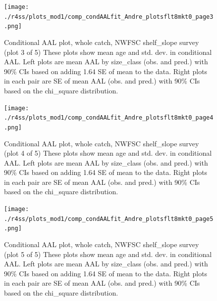 \documentclass[12pt,]{article}
\begin{document}
\begin{figure}
\centering
\texttt{[image: ./r4ss/plots\_mod1/comp\_condAALfit\_Andre\_plotsflt8mkt0\_page3.png]}
\caption{Conditional AAL plot, whole catch, NWFSC shelf\_slope survey
(plot 3 of 5) These plots show mean age and std. dev. in conditional
AAL. Left plots are mean AAL by size\_class (obs. and pred.) with 90\%
CIs based on adding 1.64 SE of mean to the data. Right plots in each
pair are SE of mean AAL (obs. and pred.) with 90\% CIs based on the
chi\_square distribution. \label{fig:nwfsc_combo_andre_3}}
\end{figure}

\begin{figure}
\centering
\texttt{[image: ./r4ss/plots\_mod1/comp\_condAALfit\_Andre\_plotsflt8mkt0\_page4.png]}
\caption{Conditional AAL plot, whole catch, NWFSC shelf\_slope survey
(plot 4 of 5) These plots show mean age and std. dev. in conditional
AAL. Left plots are mean AAL by size\_class (obs. and pred.) with 90\%
CIs based on adding 1.64 SE of mean to the data. Right plots in each
pair are SE of mean AAL (obs. and pred.) with 90\% CIs based on the
chi\_square distribution. \label{fig:nwfsc_combo_andre_4}}
\end{figure}

\begin{figure}
\centering
\texttt{[image: ./r4ss/plots\_mod1/comp\_condAALfit\_Andre\_plotsflt8mkt0\_page5.png]}
\caption{Conditional AAL plot, whole catch, NWFSC shelf\_slope survey
(plot 5 of 5) These plots show mean age and std. dev. in conditional
AAL. Left plots are mean AAL by size\_class (obs. and pred.) with 90\%
CIs based on adding 1.64 SE of mean to the data. Right plots in each
pair are SE of mean AAL (obs. and pred.) with 90\% CIs based on the
chi\_square distribution. \label{fig:nwfsc_combo_andre_5}}
\end{figure}
\end{document}
